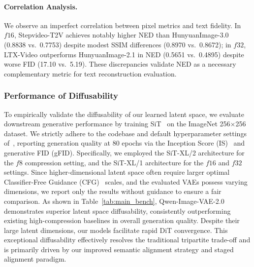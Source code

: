 \documentclass{llmxive}
\begin{document}
\paragraph{Correlation Analysis.}
We observe an imperfect correlation between pixel metrics and text fidelity. In $f16$, Stepvideo-T2V achieves notably higher NED than HunyuanImage-3.0 (0.8838 vs.\ 0.7753) despite modest SSIM differences (0.8970 vs.\ 0.8672); in $f32$, LTX-Video outperforms HunyuanImage-2.1 in NED (0.5651 vs.\ 0.4895) despite worse FID (17.10 vs.\ 5.19). These discrepancies validate NED as a necessary complementary metric for text reconstruction evaluation.

\subsubsection{Performance of Diffusability}
To empirically validate the diffusability of our learned latent space, we evaluate downstream generative performance by training SiT~\citep{sit} on the ImageNet 256$\times$256 dataset. We strictly adhere to the codebase and default hyperparameter settings of~\citet{repa-e}, reporting generation quality at 80 epochs via the Inception Score (IS)~\citep{inception} and generative FID (gFID). Specifically, we employed the SiT-XL/2 architecture for the $f8$ compression setting, and the SiT-XL/1 architecture for the $f16$ and $f32$ settings. Since higher-dimensional latent space often require larger optimal Classifier-Free Guidance (CFG)~\citep{cfg} scales, and the evaluated VAEs possess varying dimensions, we report only the results without guidance to ensure a fair comparison. As shown in Table~\ref{tab:main_bench}, Qwen-Image-VAE-2.0 demonstrates superior latent space diffusability, consistently outperforming existing high-compression baselines in overall generation quality. Despite their large latent dimensions, our models facilitate rapid DiT convergence. This exceptional diffusability effectively resolves the traditional tripartite trade-off and is primarily driven by our improved semantic alignment strategy and staged alignment paradigm.
\end{document}
